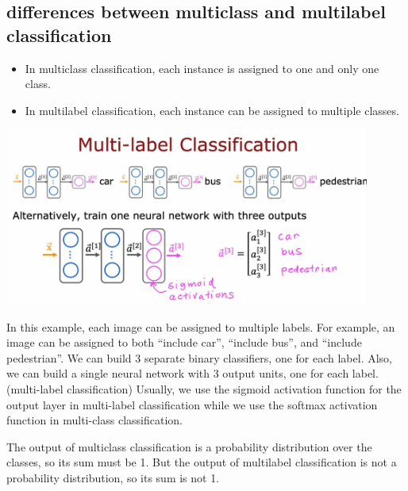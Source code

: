 \subsection*{differences between multiclass and multilabel classification}
\begin{itemize}
    \item In multiclass classification, each instance is assigned to one and only one class.
    \item In multilabel classification, each instance can be assigned to multiple classes.
\end{itemize}
\par
\includegraphics*[width=0.9\textwidth]{images/9.1}\par
In this example, each image can be assigned to multiple labels.
For example, an image can be assigned to both ``include car'', ``include bus'', and ``include pedestrian''.
We can build 3 separate binary classifiers, one for each label.
Also, we can build a single neural network with 3 output units, one for each label. (multi-label classification)
Usually, we use the sigmoid activation function for the output layer in multi-label classification 
while we use the softmax activation function in multi-class classification.
\begin{notebox}
    The output of multiclass classification is a probability distribution over the classes, so its sum must be 1.
    But the output of multilabel classification is not a probability distribution, so its sum is not 1.
\end{notebox}

